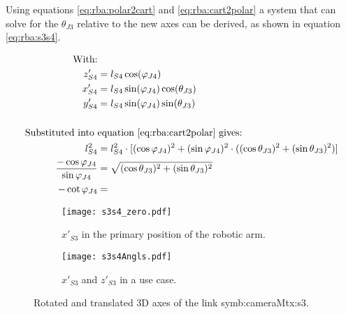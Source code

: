 \documentclass{article}
\newcommand{\sba}[1]{\gls{symb:cameraMtx:#1}}          %
\begin{document}
Using equations \ref{eq:rba:polar2cart} and \ref{eq:rba:cart2polar} a system that can solve for the $\theta_{J3}$ relative to the new axes can be derived, as shown in equation \ref{eq:rba:s3s4}.

\begin{align}
    \begin{split}
        \text{With:}&\\
        z'_{S4} &= l_{S4}\cos(\varphi_{J4})\\
        x'_{S4} &= l_{S4}\sin(\varphi_{J4})\cos(\theta_{J3})\\
        y'_{S4} &= l_{S4}\sin(\varphi_{J4})\sin(\theta_{J3})\\\\
        \text{Substituted into }&\text{equation \ref{eq:rba:cart2polar} gives:}\\
        l_{S4}^2 &= l_{S4}^2\cdot [(\cos\varphi_{J4})^2 + (\sin\varphi_{J4})^2\cdot ((\cos\theta_{J3})^2 + (\sin\theta_{J3})^2)]\\
        \frac{-\cos\varphi_{J4}}{\sin\varphi_{J4}} &= \sqrt{(\cos\theta_{J3})^2 + (\sin\theta_{J3})^2}\\
        -\cot\varphi_{J4} &=
    \end{split} \label{eq:rba:s3s4}
\end{align}

\begin{figure}[h]
    \begin{subfigure}{0.5\textwidth}
        \texttt{[image: s3s4\_zero.pdf]} 
        \caption{$x'_{S3}$ in the primary position of the robotic arm.}
        \label{fig:arm:s3s4:0pos}
    \end{subfigure}
    \begin{subfigure}{0.5\textwidth}
        \texttt{[image: s3s4Angls.pdf]}
        \caption{$x'_{S3}$ and $z'_{S3}$ in a use case.}
        \label{fig:arm:s3s4:use}
    \end{subfigure}
    \caption{Rotated and translated 3D axes of the link \sba{s3}.}
    \label{fig:arm:s3s4}
\end{figure}
\end{document}
